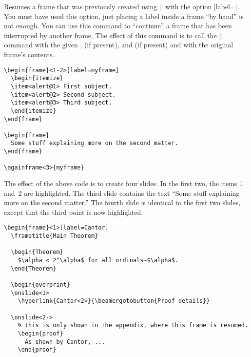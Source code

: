 \begin{command}{\againframe{}}
  \beamernote
  Resumes a frame that was previously created using |\frame| with the option |label=|. You must have used this option, just placing a label inside a frame ``by hand'' is not enough. You can use this command to ``continue'' a frame that has been interrupted by another frame. The effect of this command is to call the |\frame| command with the given ,  (if present), and  (if present) and with the original frame's contents.

  \example
\begin{verbatim}
\begin{frame}<1-2>[label=myframe]
  \begin{itemize}
  \item<alert@1> First subject.
  \item<alert@2> Second subject.
  \item<alert@3> Third subject.
  \end{itemize}
\end{frame}

\begin{frame}
  Some stuff explaining more on the second matter.
\end{frame}

\againframe<3>{myframe}
\end{verbatim}

  The effect of the above code is to create four slides. In the first two, the items 1 and~2 are highlighted. The third slide contains the text ``Some stuff explaining more on the second matter.'' The fourth slide is identical to the first two slides, except that the third point is now highlighted.

  \example
\begin{verbatim}
\begin{frame}<1>[label=Cantor]
  \frametitle{Main Theorem}

  \begin{Theorem}
    $\alpha < 2^\alpha$ for all ordinals~$\alpha$.
  \end{Theorem}

  \begin{overprint}
  \onslide<1>
    \hyperlink{Cantor<2>}{\beamergotobutton{Proof details}}

  \onslide<2->
    % this is only shown in the appendix, where this frame is resumed.
    \begin{proof}
      As shown by Cantor, ...
    \end{proof}


\end{verbatim}
\end{command}
